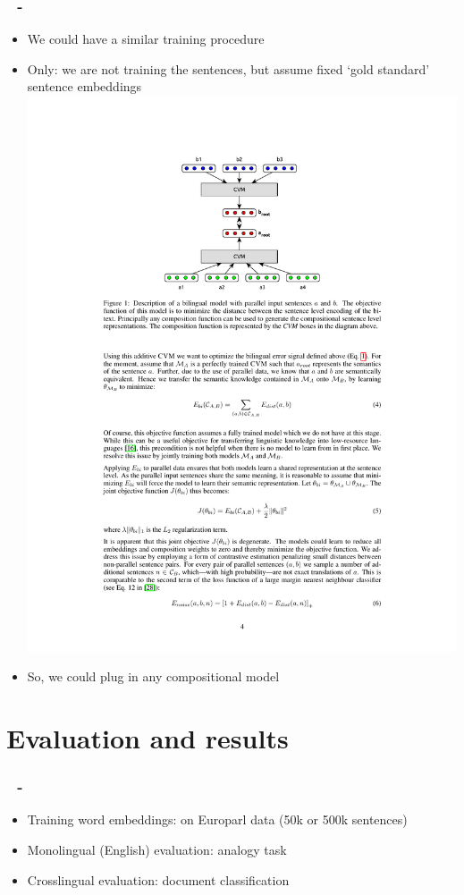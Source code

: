\documentclass{beamer}
\newenvironment{dia}
{
\begin{frame}[fragile, environment=dia]
\frametitle{\insertsection
\ifx\insertsubsection\empty\else
      \,~-~\insertsubsection             %
   \fi}
}
{
\end{frame}
}
\begin{document}
\begin{dia}
\begin{itemize}
\item We could have a similar training procedure
\item Only: we are not training the sentences, but assume fixed `gold standard' sentence embeddings
\includegraphics[width=.7\linewidth]{figures/hermannBlunsomHalf}
\item So, we could plug in any compositional model 
\end{itemize}
\end{dia}




\section{Evaluation and results}
\begin{dia}
\begin{itemize}
\item Training word embeddings: on Europarl data (50k or 500k sentences)
\item Monolingual (English) evaluation: analogy task
\item Crosslingual evaluation: document classification
\end{itemize}
\end{dia}
\end{document}
